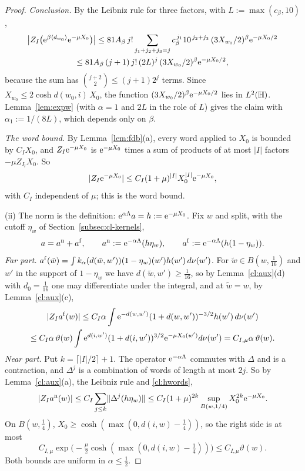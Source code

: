 \begin{proof}
\emph{Conclusion.} By the Leibniz rule for three factors, with $L:=\max(c_\beta,10)$,
\begin{multline*}
\bigl|Z_I\bigl(\mathrm{e}^{\beta\langle d_{w_0}\rangle}\mathrm{e}^{-\mu X_0}\bigr)\bigr|\le81A_\beta\,j!\sum_{j_1+j_2+j_3=j}c_\beta^{\,j_1}10^{\,j_2+j_3}\,(3X_{w_0}/2)^\beta\mathrm{e}^{-\mu X_0/2}\\
\le81A_\beta\,(j+1)\,j!\,(2L)^j\,(3X_{w_0}/2)^\beta\mathrm{e}^{-\mu X_0/2},
\end{multline*}
because the sum has $\binom{j+2}2\le(j+1)2^j$ terms. Since $X_{w_0}\le2\cosh d(w_0,i)\,X_0$, the function $(3X_{w_0}/2)^\beta\mathrm{e}^{-\mu X_0/2}$ lies in
$L^2(\mathbb{H})$. Lemma~\ref{lem:expw} (with $\alpha=1$ and $2L$ in the role of $L$) gives the claim with $\alpha_1:=1/(8L)$, which depends only on $\beta$.

\emph{The word bound.} By Lemma~\ref{lem:fdb}(a), every word applied to
$X_0$ is bounded by $C_IX_0$, and $Z_I\mathrm{e}^{-\mu X_0}$ is $\mathrm{e}^{-\mu X_0}$ times a sum of products of at most $|I|$ factors $-\mu Z_{I_l}X_0$. So
\begin{equation}\label{cl:hwords}
|Z_I\mathrm{e}^{-\mu X_0}|\le C_I(1+\mu)^{|I|}X_0^{|I|}\mathrm{e}^{-\mu X_0},
\end{equation}
with $C_I$ independent of $\mu$; this is the word bound.

(ii) The norm is the definition: $\mathrm{e}^{\alpha\Lambda}a=h:=\mathrm{e}^{-\mu X_0}$. Fix $w$ and split, with the cutoff $\eta_w$ of
Section~\ref{subsec:cl-kernels},
\[
a=a^{\rm n}+a^{\rm f},\qquad a^{\rm n}:=\mathrm{e}^{-\alpha\Lambda}(h\eta_w),\qquad a^{\rm f}:=\mathrm{e}^{-\alpha\Lambda}(h(1-\eta_w)).
\]
\emph{Far part.} $a^{\rm f}(\tilde w)=\int k_\alpha(d(\tilde w,w'))(1-\eta_w)(w')h(w')\,d\nu(w')$. For $\tilde w\in B(w,\tfrac1{16})$ and $w'$ in the support of
$1-\eta_w$ we have $d(\tilde w,w')\ge\tfrac1{16}$, so by Lemma~\ref{cl:aux}(d) with $d_0=\tfrac1{16}$ one may differentiate under the integral, and at $\tilde w=w$, by Lemma~\ref{cl:aux}(c),
\begin{multline*}
|Z_Ia^{\rm f}(w)|\le C_I\alpha\int\mathrm{e}^{-d(w,w')}(1+d(w,w'))^{-3/2}h(w')\,d\nu(w')\\
\le C_I\alpha\,\vartheta(w)\int\mathrm{e}^{d(i,w')}(1+d(i,w'))^{3/2}\mathrm{e}^{-\mu X_0(w')}d\nu(w')=C_{I,\mu}\alpha\,\vartheta(w).
\end{multline*}
\emph{Near part.} Put $k=\lceil|I|/2\rceil+1$. The operator $\mathrm{e}^{-\alpha\Lambda}$ commutes with $\Delta$ and is a contraction, and $\Delta^j$ is a combination of words of length at most $2j$. So by Lemma~\ref{cl:aux}(a),
the Leibniz rule and \eqref{cl:hwords},
\[
|Z_Ia^{\rm n}(w)|\le C_I\sum_{j\le k}\lVert \Delta^j(h\eta_w)\rVert\le C_I(1+\mu)^{2k}\sup_{B(w,1/4)}X_0^{2k}\mathrm{e}^{-\mu X_0} .
\]
On $B(w,\tfrac14)$, $X_0\ge\cosh(\max(0,d(i,w)-\tfrac14))$, so the right side is at most
\[
C_{I,\mu}\exp\bigl(-\tfrac\mu2\cosh(\max(0,d(i,w)-\tfrac14))\bigr)\le C_{I,\mu}\vartheta(w).
\]
Both bounds are uniform in $\alpha\le\tfrac12$.

\end{proof}

